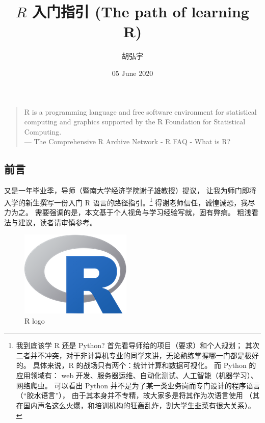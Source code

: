 \documentclass[11pt,hyperref]{ctexart}
\title{\(R\) 入门指引 (The path of learning R)\\\vspace{0.5em}{\large \url{https://github.com/jun3970/R-Intro}}}
\author{胡弘宇}
\date{05 June 2020}
\begin{document}
\maketitle

\begin{quote}
R is a programming language and free software environment for
statistical computing and graphics supported by the R Foundation for
Statistical Computing.\\
--- The Comprehensive R Archive Network - R FAQ - What is R?
\end{quote}

\hypertarget{ux524dux8a00}{%
\subsection{前言}\label{ux524dux8a00}}

又是一年毕业季，导师（暨南大学经济学院谢子雄教授）提议，
让我为师门即将入学的新生撰写一份入门 R 语言的路径指引。\footnote{我到底该学
  R 还是 Python? 首先看导师给的项目（要求）和个人规划；
  其次二者并不冲突，对于非计算机专业的同学来讲，无论熟练掌握哪一门都是极好的。
  具体来说，R 的战场只有两个：统计计算和数据可视化。 而 Python
  的应用领域有： web
  开发、服务器运维、自动化测试、人工智能（机器学习）、网络爬虫。
  可以看出 Python
  并不是为了某一类业务岗而专门设计的程序语言（``胶水语言''），
  由于其本身并不专精，故大家多是将其作为次语言使用
  （其在国内声名这么火爆，和培训机构的狂轰乱炸，割大学生韭菜有很大关系）。}
得谢老师信任，诚惶诚恐，我尽力为之。
需要强调的是，本文基于个人视角与学习经验写就，固有弊病。
粗浅看法与建议，读者请审慎参考。

\begin{figure}
\centering
\includegraphics{images/R-logo.png}
\caption{R logo}
\end{figure}
\end{document}

